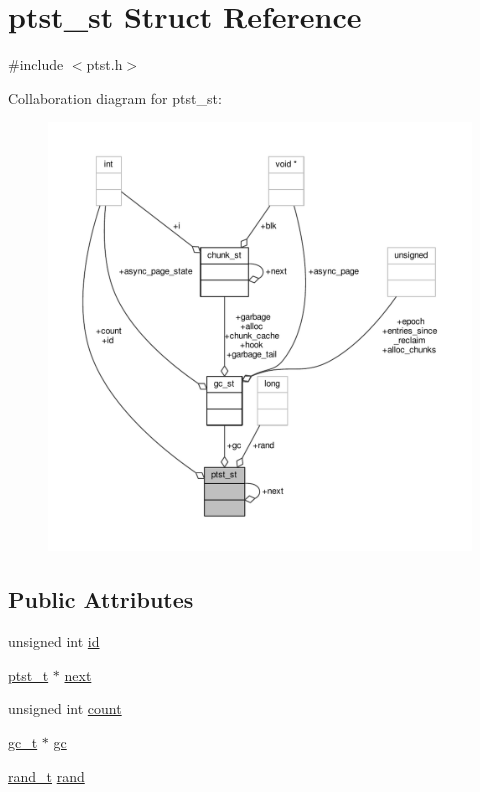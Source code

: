 \hypertarget{structptst__st}{\section{ptst\-\_\-st Struct Reference}
\label{structptst__st}
}


{\ttfamily \#include $<$ptst.\-h$>$}



Collaboration diagram for ptst\-\_\-st\-:
\nopagebreak
\begin{figure}[H]
\begin{center}
\leavevmode
\includegraphics[width=350pt]{structptst__st__coll__graph}
\end{center}
\end{figure}
\subsection*{Public Attributes}
\begin{DoxyCompactItemize}
\item 
unsigned int \hyperlink{structptst__st_af174fa81aa64e606612795b7b1dc83e7}{id}
\item 
\hyperlink{ptst_8h_a1c1965dad228ac64fc833c78267fc595}{ptst\-\_\-t} $\ast$ \hyperlink{structptst__st_a77d37efa51f5e5a298a2add3bac557ef}{next}
\item 
unsigned int \hyperlink{structptst__st_aef54caaf3df5ccda6bc73784579e1c9a}{count}
\item 
\hyperlink{gc_8h_a8a20138fd0c343ba1379616c9417e5fb}{gc\-\_\-t} $\ast$ \hyperlink{structptst__st_a7754d5a3a9ef62a128fdfb068e3d7328}{gc}
\item 
\hyperlink{common_2fraser_2random_8h_ad3d05e154ed8e31a6dc75bbe7c124997}{rand\-\_\-t} \hyperlink{structptst__st_a0d0c7772d66ae84cb1304f9defd32dfe}{rand}
\end{DoxyCompactItemize}


